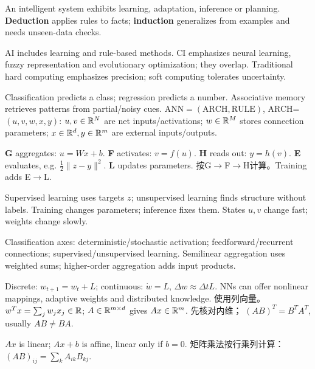 \noindent
\columnstart
{}
An intelligent system exhibits learning, adaptation, inference or planning. \textbf{Deduction} applies rules to facts; \textbf{induction} generalizes from examples and needs unseen-data checks.

AI includes learning and rule-based methods. CI emphasizes neural learning, fuzzy representation and evolutionary optimization; they overlap. Traditional hard computing emphasizes precision; soft computing tolerates uncertainty.

Classification predicts a class; regression predicts a number. Associative memory retrieves patterns from partial/noisy cues.
$\mathrm{ANN}=(\mathrm{ARCH},\mathrm{RULE})$, ARCH=$(u,v,w,x,y)$: $u,v\in\mathbb{R}^N$ are net inputs/activations; $w\in\mathbb{R}^M$ stores connection parameters; $x\in\mathbb{R}^d,y\in\mathbb{R}^m$ are external inputs/outputs.

\textbf{G} aggregates: $u=Wx+b$. \textbf{F} activates: $v=f(u)$. \textbf{H} reads out: $y=h(v)$. \textbf{E} evaluates, e.g. $\frac12\|z-y\|^2$. \textbf{L} updates parameters. 按G$\to$F$\to$H计算。Training adds E$\to$L.

Supervised learning uses targets $z$; unsupervised learning finds structure without labels. Training changes parameters; inference fixes them. States $u,v$ change fast; weights change slowly.

Classification axes: deterministic/stochastic activation; feedforward/recurrent connections; supervised/unsupervised learning. Semilinear aggregation uses weighted sums; higher-order aggregation adds input products.

Discrete: $w_{t+1}=w_t+L$; continuous: $\dot w=L$, $\Delta w\approx\Delta tL$. NNs can offer nonlinear mappings, adaptive weights and distributed knowledge.
使用列向量。 $w^Tx=\sum_jw_jx_j\in\mathbb{R}$; $A\in\mathbb{R}^{m\times d}$ gives $Ax\in\mathbb{R}^m$. 先核对内维； $(AB)^T=B^TA^T$, usually $AB\ne BA$.

$Ax$ is linear; $Ax+b$ is affine, linear only if $b=0$. 矩阵乘法按行乘列计算： $(AB)_{ij}=\sum_k A_{ik}B_{kj}$.

